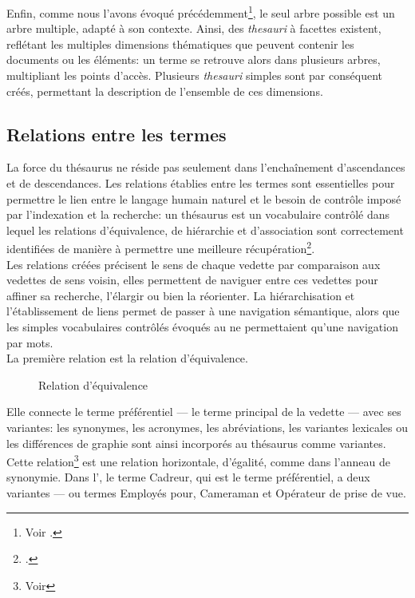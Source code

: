 

Enfin, comme nous l'avons évoqué précédemment\footnote{Voir .}, le seul arbre possible est un arbre multiple, adapté à son contexte. Ainsi, des \textit{thesauri} à facettes existent, reflétant les multiples dimensions thématiques que peuvent contenir les documents ou les éléments: un terme se retrouve alors dans plusieurs arbres, multipliant les points d'accès. Plusieurs \textit{thesauri} simples sont par conséquent créés, permettant la description de l'ensemble de ces dimensions.

\subsection{\label{I-C-2-b}Relations entre les termes}

La force du thésaurus ne réside pas seulement dans l'enchaînement d'ascendances et de descendances. Les relations établies entre les termes sont essentielles pour permettre le lien entre le langage humain naturel et le besoin de contrôle imposé par l'indexation et la recherche: un thésaurus est \og un vocabulaire contrôlé dans lequel les relations d'équivalence, de hiérarchie et d'association sont correctement identifiées de manière à permettre une meilleure récupération\fg{}\footcite{rosenfeld_information_2015}.\\

Les relations créées précisent le sens de chaque vedette par comparaison aux vedettes de sens voisin, elles permettent de naviguer entre ces vedettes pour affiner sa recherche, l'élargir ou bien la réorienter. La hiérarchisation et l'établissement de liens permet de passer à une navigation sémantique, alors que les simples vocabulaires contrôlés évoqués au  ne permettaient qu'une navigation par mots.\\

La première relation est la relation d'équivalence.
\begin{wrapfigure}{L}{4cm}
	\centering
	
	\caption{Relation d'équivalence}
	\label{relation_equivalence}	
\end{wrapfigure} Elle connecte le terme préférentiel --- le terme principal de la vedette --- avec ses variantes: les synonymes, les acronymes, les abréviations, les variantes lexicales ou les différences de graphie sont ainsi incorporés au thésaurus comme variantes. Cette relation\footnote{Voir } est une relation horizontale, d'égalité, comme dans l'anneau de synonymie. Dans l', le terme \og Cadreur\fg{}, qui est le terme préférentiel, a deux variantes --- ou termes \og Employés pour\fg{}, \og Cameraman\fg{} et \og Opérateur de prise de vue\fg{}.\\

